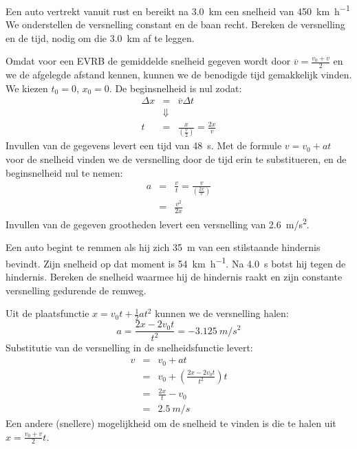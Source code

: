 \documentclass{ximera}
\begin{document}
\begin{exercise}
    Een auto vertrekt vanuit rust en bereikt na \SI{3,0}{km} een snelheid van \SI{450}{\kilo\meter\per\hour} We onderstellen de versnelling constant en de baan recht. Bereken de versnelling en de tijd, nodig om die \SI{3,0}{km} af te leggen.
\begin{oplossing}
    Omdat voor een EVRB de gemiddelde snelheid gegeven wordt door $\overline{v}=\frac{v_0+v}{2}$ en we de afgelegde afstand kennen, kunnen we de benodigde tijd gemakkelijk vinden. We kiezen $t_0=0$, $x_0=0$. De beginsnelheid is nul zodat:
    \begin{eqnarray*}
        \Delta x &=& \overline{v}\Delta t \\
        &\Downarrow & \\
        t &=& \frac{x}{\left(\frac{v}{2}\right)} = \frac{2x}{v}
    \end{eqnarray*}
    Invullen van de gegevens levert een tijd van \SI{48}{s}. Met de formule $v=v_0+at$ voor de snelheid vinden we de versnelling door de tijd erin te substitueren, en de beginsnelheid nul te nemen:
    \begin{eqnarray*}
        a &=& \frac{v}{t}=\frac{v}{\left(\frac{2x}{v}\right)}\\
        &=& \frac{v^2}{2x}
    \end{eqnarray*}
    Invullen van de gegeven grootheden levert een versnelling van \SI{2,6}{m/s^2}.
\end{oplossing}
\end{exercise}

\begin{exercise}
    Een auto begint te remmen als hij zich \SI{35}{m} van een stilstaande hindernis bevindt. Zijn snelheid op dat moment is \SI{54}{\kilo\meter\per\hour}. Na \SI{4,0}{s} botst hij tegen de hindernis. Bereken de snelheid waarmee hij de hindernis raakt en zijn constante versnelling gedurende de remweg.
    \begin{oplossing}
    Uit de plaatsfunctie $x=v_0t+\frac{1}{2}at^2$ kunnen we de versnelling halen:
    \begin{equation*}
        a=\frac{2x-2v_0t}{t^2}=\SI{-3,125}{m/s^2}
    \end{equation*}
    Substitutie van de versnelling in de snelheidsfunctie levert:
    \begin{eqnarray*}
        v&=&v_0+at\\
        &=&v_0+\left(\frac{2x-2v_0t}{t^2}\right)t\\
        &=&\frac{2x}{t}-v_0\\
        &=&\SI{2,5}{m/s}
    \end{eqnarray*}
    Een andere (snellere) mogelijkheid om de snelheid te vinden is die te halen uit $x=\frac{v_0+v}{2}t$.
    \end{oplossing}
\end{exercise}
\end{document}
